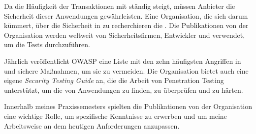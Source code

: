 Da die Häufigkeit der Transaktionen mit  ständig steigt, müssen Anbieter die Sicherheit dieser Anwendungen gewährleisten. Eine Organisation, die sich darum kümmert, über die Sicherheit in  zu recherchieren die . Die Publikationen von der Organisation werden weltweit von Sicherheitsfirmen, Entwickler und  verwendet, um die Tests durchzuführen. 

Jährlich veröffentlicht \gls{OWASP} eine Liste mit den zehn häufigsten Angriffen in  und sichere Maßnahmen, um sie zu vermeiden. Die Organisation bietet auch eine eigene \textit{Security Testing Guide} an, die die Arbeit von Penetration Testing unterstützt, um die  von Anwendungen zu finden, zu überprüfen und zu härten.

Innerhalb meines Praxissemesters spielten die Publikationen von der Organisation eine wichtige Rolle, um spezifische Kenntnisse zu erwerben und um meine Arbeitsweise an dem heutigen Anforderungen anzupassen. 